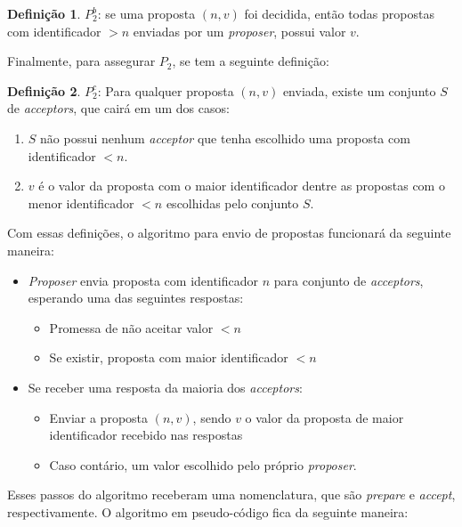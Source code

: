 \documentclass[
    12pt,
    openright, 
    oneside,
    a4paper,
    french,
    english,
    brazil
    ]{facom-ufu-abntex2}
\theoremstyle{definition}
\newtheorem{definition}{Definição}
\begin{document}
\begin{definition}
$P_2^b$: se uma proposta $(n, v)$ foi decidida, então todas propostas com identificador
$>n$ enviadas por um \emph{proposer}, possui valor $v$.
\end{definition}

Finalmente, para assegurar $P_2$, se tem a seguinte definição:

\begin{definition}
$P_2^c$: Para qualquer proposta $(n, v)$ enviada, existe um conjunto $S$ de
\emph{acceptors}, que cairá em um dos casos:

\begin{enumerate}
    \item $S$ não possui nenhum \emph{acceptor} que tenha escolhido uma proposta com 
identificador $<n$.

    \item $v$ é o valor da proposta com o maior identificador dentre as propostas com o 
menor identificador $<n$ escolhidas pelo conjunto $S$.
\end{enumerate}
\end{definition}

Com essas definições, o algoritmo para envio de propostas funcionará da seguinte maneira:

\begin{itemize}
    \item[]\emph{Proposer} envia proposta com identificador $n$ para conjunto de 
\emph{acceptors}, esperando uma das seguintes respostas:

    \begin{itemize}
        \item[] Promessa de não aceitar valor $<n$
        \item[] Se existir, proposta com maior identificador $<n$
    \end{itemize}
    
    \item[]Se receber uma resposta da maioria dos \emph{acceptors}:
    \begin{itemize}
        \item[] Enviar a proposta $(n, v)$, sendo $v$ o valor da proposta de maior identificador
        recebido nas respostas
        \item[] Caso contário, um valor escolhido pelo próprio \emph{proposer}.
    \end{itemize}
\end{itemize}

Esses passos do algoritmo receberam uma nomenclatura, que são \emph{prepare} e
\emph{accept}, respectivamente. O algoritmo em pseudo-código fica da seguinte maneira:
\end{document}
